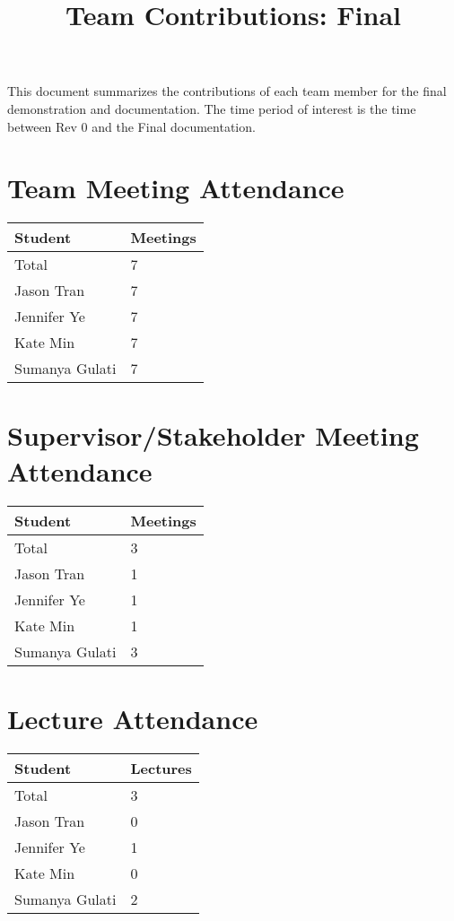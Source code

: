 \documentclass{article}
\title{Team Contributions: Final\\\progname}
\author{\authname}
\date{}
\begin{document}
\maketitle

This document summarizes the contributions of each team member for the final
demonstration and documentation.  The time period of interest is the time
between Rev 0 and the Final documentation.

\section{Team Meeting Attendance}

\begin{table}[H]
\centering
\begin{tabular}{ll}
\toprule
\textbf{Student} & \textbf{Meetings}\\
\midrule
Total & 7\\
Jason Tran & 7\\
Jennifer Ye & 7\\
Kate Min & 7\\
Sumanya Gulati & 7\\
\bottomrule
\end{tabular}
\end{table}

\section{Supervisor/Stakeholder Meeting Attendance}

\begin{table}[H]
\centering
\begin{tabular}{ll}
\toprule
\textbf{Student} & \textbf{Meetings}\\
\midrule
Total & 3\\
Jason Tran & 1\\
Jennifer Ye & 1\\
Kate Min & 1\\
Sumanya Gulati & 3\\
\bottomrule
\end{tabular}
\end{table}

\section{Lecture Attendance}

\begin{table}[H]
\centering
\begin{tabular}{ll}
\toprule
\textbf{Student} & \textbf{Lectures}\\
\midrule
Total & 3\\
Jason Tran & 0\\
Jennifer Ye & 1\\
Kate Min & 0\\
Sumanya Gulati & 2\\
\bottomrule
\end{tabular}
\end{table}
\end{document}
